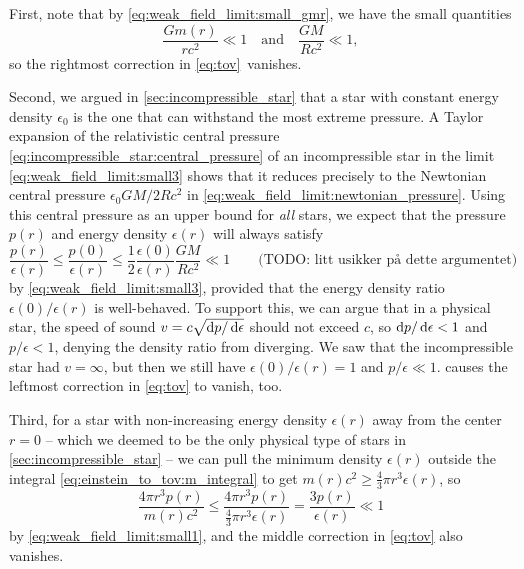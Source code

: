 First, note that by \cref{eq:weak_field_limit:small_gmr}, we have the small quantities
\begin{equation}
	\frac{Gm(r)}{rc^2} \ll 1
	\quad \text{and} \quad
	\frac{GM}{Rc^2} \ll 1 ,
	\label{eq:weak_field_limit:small3}
\end{equation}
so the rightmost correction in \cref{eq:tov} vanishes.

Second, we argued in \cref{sec:incompressible_star} that a star with constant energy density $\epsilon_0$ is the one that can withstand the most extreme pressure.
A Taylor expansion of the relativistic central pressure \eqref{eq:incompressible_star:central_pressure} of an incompressible star in the limit \eqref{eq:weak_field_limit:small3} shows that it reduces precisely to the Newtonian central pressure $\epsilon_0 G M / 2 R c^2$ in \cref{eq:weak_field_limit:newtonian_pressure}.
Using this central pressure as an upper bound for \emph{all} stars, we expect that the pressure $p(r)$ and energy density $\epsilon(r)$ will always satisfy
\begin{equation}
	\frac{p(r)}{\epsilon(r)} \leq \frac{p(0)}{\epsilon(r)} 
	                         \leq \frac12 \frac{\epsilon(0)}{\epsilon(r)} \frac{GM}{Rc^2} \ll 1
	\qquad \text{(TODO: litt usikker på dette argumentet)}
	\label{eq:weak_field_limit:small1}
\end{equation}
by \cref{eq:weak_field_limit:small3}, provided that the energy density ratio $\epsilon(0) / \epsilon(r)$ is well-behaved.
To support this, we can argue that in a physical star, the speed of sound $v = c \sqrt{\mathop{}\!\mathrm{d} p / \mathop{}\!\mathrm{d} \epsilon}$ should not exceed $c$, so $\mathop{}\!\mathrm{d} p / \mathop{}\!\mathrm{d} \epsilon < 1$ and $p/\epsilon < 1$, denying the density ratio from diverging.
We saw that the incompressible star had $v = \infty$, but then we still have $\epsilon(0)/\epsilon(r) = 1$ and $p/\epsilon \ll 1$.
 causes the leftmost correction in \cref{eq:tov} to vanish, too.

Third, for a star with non-increasing energy density $\epsilon(r)$ away from the center $r=0$ -- which we deemed to be the only physical type of stars in \cref{sec:incompressible_star} -- we can pull the minimum density $\epsilon(r)$ outside the integral \eqref{eq:einstein_to_tov:m_integral} to get $m(r) c^2 \geq \frac{4}{3} \pi r^3 \epsilon(r)$, so
\begin{equation}
	\frac{4 \pi r^3 p(r)}{m(r) c^2} \leq \frac{4 \pi r^3 p(r)}{\frac{4}{3} \pi r^3 \epsilon(r)}
	                                =    \frac{3 p(r)}{\epsilon(r)}
						            \ll  1
	\label{eq:weak_field_limit:small2}
\end{equation}
by \cref{eq:weak_field_limit:small1}, and the middle correction in \cref{eq:tov} also vanishes.

